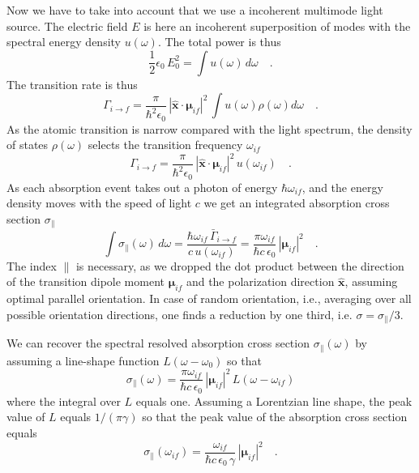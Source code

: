 Now we have to take into account that we use a incoherent multimode light source. The electric field $E$ is here an incoherent superposition of  modes with the  spectral energy density $u(\omega)$.
The total power is thus
\begin{equation}
 \frac{1}{2} \epsilon_0  \, E_0^2  = \int  u(\omega)  \, d\omega \quad .
\end{equation}
The  transition rate is thus 
\begin{equation}
 \Gamma_{i \rightarrow f} =   \frac{\pi  }{\hbar^2 \epsilon_0}  \, |\mathbf{\hat{x}} \cdot \mathbf{\mu}_{if} |^2 \,
\int u(\omega)  
  \rho(\omega)  d \omega \quad .
\end{equation}
As the atomic transition is narrow compared with the light spectrum, the density of states $\rho(\omega)$ selects the transition frequency $\omega_{if}$ 
\begin{equation}
 \Gamma_{i \rightarrow f} =   \frac{\pi  }{\hbar^2 \epsilon_0}  \, |\mathbf{\hat{x}} \cdot \mathbf{\mu}_{if} |^2 \,
 u(\omega_{if})   \quad .
\end{equation}
As each absorption event takes out a photon of energy $\hbar \omega_{if}$, and the energy density moves with the speed of light $c$ we get an integrated absorption cross section $\sigma_{\parallel}$ 
\begin{equation}
 \int \sigma_{\parallel}(\omega) \, d \omega = \frac{ \hbar \omega_{if} \, \bar{\Gamma}_{i \rightarrow f} }{c \, u(\omega_{if})}  = 
  \frac{\pi \omega_{if}}{ \hbar c \, \epsilon_0} \,
 |\mathbf{\mu}_{if} |^2  \quad . \label{eq:abs_sigma_mu}
\end{equation}
The index ${\parallel} $ is necessary, as we dropped the dot product between the direction of the transition dipole moment $\mathbf{\mu}_{if}$ and the polarization direction $\mathbf{\hat{x}}$, assuming optimal parallel orientation. In case of random orientation, i.e., averaging over all possible orientation directions, one finds  a reduction by one third, i.e. $\sigma = \sigma_{\parallel} / 3$.

We can recover the spectral resolved absorption cross section $\sigma_{\parallel}(\omega)$ by assuming a line-shape function $L(\omega - \omega_0)$ so that 
\begin{equation}
 \sigma_{\parallel}(\omega) =  \frac{\pi \omega_{if}}{ \hbar c \, \epsilon_0} \,
 |\mathbf{\mu}_{if} |^2 \, L(\omega - \omega_{if})
\end{equation}
where the integral over $L$ equals one. Assuming a Lorentzian line shape, the peak value of $L$ equals $1/(\pi \gamma)$ so that the peak value of the absorption cross section equals
\begin{equation}
 \sigma_{\parallel}(\omega_{if}) =  \frac{\omega_{if}}{ \hbar c \, \epsilon_0 \, \gamma} \,
 |\mathbf{\mu}_{if} |^2  \quad .
\end{equation}


